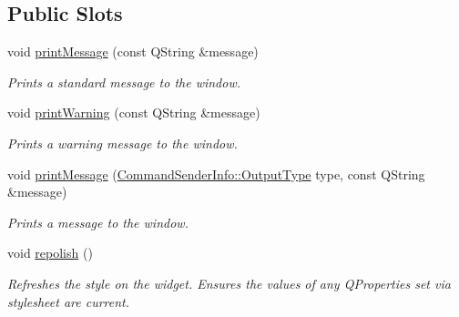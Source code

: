 \subsection*{Public Slots}
\begin{DoxyCompactItemize}
\item 
void \hyperlink{class_console_widget_a04e2902e857852f3185c74de71ae3c9b}{print\-Message} (const Q\-String \&message)
\begin{DoxyCompactList}\small\item\em Prints a standard message to the window. \end{DoxyCompactList}\item 
void \hyperlink{class_console_widget_adef216de346ef5f08f38c0874777167b}{print\-Warning} (const Q\-String \&message)
\begin{DoxyCompactList}\small\item\em Prints a warning message to the window. \end{DoxyCompactList}\item 
void \hyperlink{class_console_widget_a9f7957ef32ab4e68a58b0cbcf1c07c89}{print\-Message} (\hyperlink{class_command_sender_info_a3a5e6a2ef1772f6557f351652c2e3b60}{Command\-Sender\-Info\-::\-Output\-Type} type, const Q\-String \&message)
\begin{DoxyCompactList}\small\item\em Prints a message to the window. \end{DoxyCompactList}\item 
\hypertarget{class_console_widget_ab079b67c769e850d451ad3fdbbbdc750}{void \hyperlink{class_console_widget_ab079b67c769e850d451ad3fdbbbdc750}{repolish} ()}\label{class_console_widget_ab079b67c769e850d451ad3fdbbbdc750}

\begin{DoxyCompactList}\small\item\em Refreshes the style on the widget. Ensures the values of any Q\-Properties set via stylesheet are current. \end{DoxyCompactList}\end{DoxyCompactItemize}

